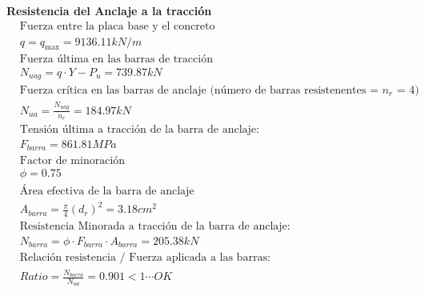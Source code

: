 \documentclass[12pt]{article}
\begin{document}
    \noindent \textbf{Resistencia del Anclaje a la tracción}
        \begin{align*}
            &\text{Fuerza entre la placa base y el concreto} \hspace{15cm} \\
            &q = q_{\max} = 9136.11 kN/m \\
            &\text{Fuerza última en las barras de tracción} \\
            &N_{uag}=q \cdot Y - P_u = 739.87 kN \\
            &\text{Fuerza crítica en las barras de anclaje (número de barras resistenentes = $n_r$ = 4)}  \\
            &N_{ua} = \frac{N_{uag}}{n_r} = 184.97 kN\\
            &\text{Tensión última a tracción de la barra de anclaje:} \\
            &F_{barra} = 861.81 MPa \\
            &\text{Factor de minoración}\\
            &\phi = 0.75 \\
            &\text{Área efectiva de la barra de anclaje}\\
            &A_{barra} = \frac{\pi}{4} {(d_r)}^ 2 = 3.18 cm^2 \\
            &\text{Resistencia Minorada a tracción de la barra de anclaje:}\\
            &N_{barra} = \phi \cdot F_{barra} \cdot A_{barra} = 205.38 kN\\
            &\text{Relación resistencia / Fuerza aplicada a las barras:} \\
            &Ratio = \frac{N_{barra}}{N_{ua}} = 0.901 < 1 \cdots OK
        \end{align*}  
        
\end{document}
